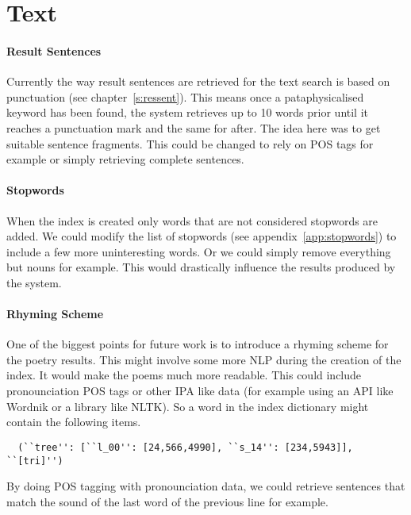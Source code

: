 \documentclass[11pt]{thesis} %
\begin{document}
\section{Text}

\paragraph{Result Sentences} 
Currently the way result sentences are retrieved for the text search is based on punctuation (see chapter~\ref{s:ressent}). This means once a pataphysicalised keyword has been found, the system retrieves up to \num{10} words prior until it reaches a punctuation mark and the same for after. The idea here was to get suitable sentence fragments. This could be changed to rely on \ac{POS} tags for example or simply retrieving complete sentences.

\paragraph{Stopwords}
When the index is created only words that are not considered stopwords are added. We could modify the list of stopwords (see appendix~\ref{app:stopwords}) to include a few more uninteresting words. Or we could simply remove everything but nouns for example. This would drastically influence the results produced by the system.

\paragraph{Rhyming Scheme} 
One of the biggest points for future work is to introduce a rhyming scheme for the poetry results. This might involve some more \ac{NLP} during the creation of the index. It would make the poems much more readable. This could include pronounciation \ac{POS} tags or other \ac{IPA} like data (for example using an \ac{API} like Wordnik \autocite{Wordnik2016} or a library like \ac{NLTK}). So a word in the index dictionary might contain the following items.

\begin{verbatim}
  (``tree'': [``l_00'': [24,566,4990], ``s_14'': [234,5943]], ``[tri]'')
\end{verbatim}

By doing \ac{POS} tagging with pronounciation data, we could retrieve sentences that match the sound of the last word of the previous line for example.
\end{document}
